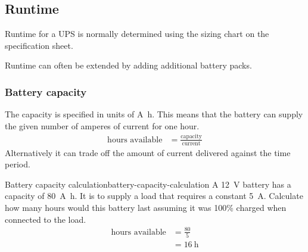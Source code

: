 \documentclass{pgnotes}
\begin{document}
\subsection{Runtime}

Runtime for a UPS is normally determined using the sizing chart on the specification sheet.

Runtime can often be extended by adding additional battery packs.

\subsubsection{Battery capacity}

The capacity is specified in units of \si{\ampere\hour}.
This means that the battery can supply the given number of amperes of current for one hour.
\begin{align}
  \mbox{hours available} & = \frac{\mbox{capacity}}{\mbox{current}}
\end{align}
Alternatively it can trade off the amount of current delivered against the time period.





\begin{example}{Battery capacity calculation}{battery-capacity-calculation}
  A \SI{12}{\volt} battery has a capacity of \SI{80}{\ampere\hour}.
  It is to supply a load that requires a constant \SI{5}{\ampere}.
  Calculate how many hours would this battery last assuming it was 100\% charged when connected to the load.
  \tcblower
  \begin{align}
    \mbox{hours available} & = \frac{80}{5} \\
                           & = \SI{16}{\hour} 
  \end{align}
\end{example}
\end{document}
